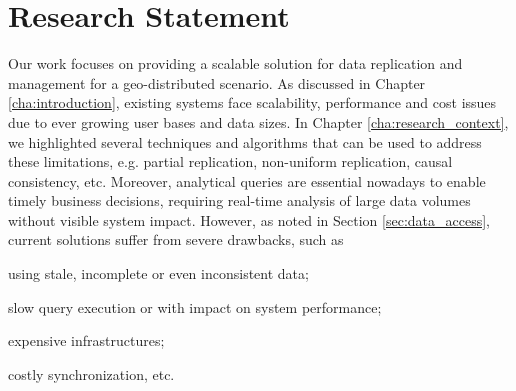 
%

\chapter{Research Statement}
\label{cha:research_statement}


Our work focuses on providing a scalable solution for data replication and management for a geo-distributed scenario.
As discussed in Chapter \ref{cha:introduction}, existing systems face scalability, performance and cost issues due to ever growing user bases and data sizes. %
In Chapter \ref{cha:research_context}, we highlighted several techniques and algorithms that can be used to address these limitations, e.g. partial replication, non-uniform replication, causal consistency, etc.
Moreover, analytical queries are essential nowadays to enable timely business decisions, requiring real-time analysis of large data volumes without visible system impact.
However, as noted in Section \ref{sec:data_access}, current solutions suffer from severe drawbacks, such as
\begin{enumerate*}[label=(\roman*)]
\item using stale, incomplete or even inconsistent data; 
\item slow query execution or with impact on system performance;
\item expensive infrastructures;
\item costly synchronization, etc.
\end{enumerate*}


